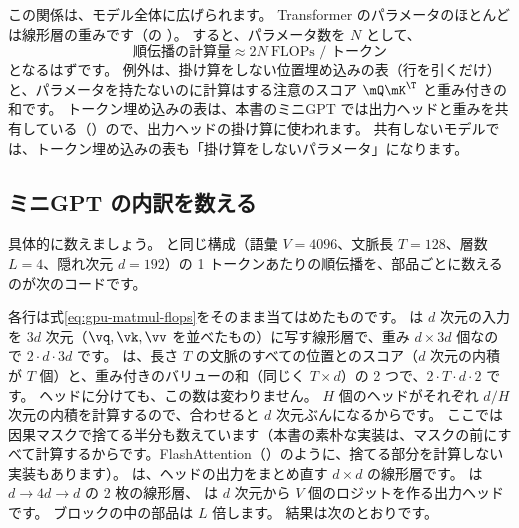 この関係は、モデル全体に広げられます。
Transformer のパラメータのほとんどは線形層の重みです（の ）。
すると、パラメータ数を $N$ として、
\begin{equation}
  \text{順伝播の計算量} \approx 2N \ \text{FLOPs / トークン}
  \label{eq:gpu-forward-2n}
\end{equation}
となるはずです。
例外は、掛け算をしない位置埋め込みの表（行を引くだけ）と、パラメータを持たないのに計算はする注意のスコア $\mQ\mK^\T$ と重み付きの和です。
トークン埋め込みの表は、本書のミニGPT では出力ヘッドと重みを共有している（）ので、出力ヘッドの掛け算に使われます。
共有しないモデルでは、トークン埋め込みの表も「掛け算をしないパラメータ」になります。

\subsection*{ミニGPT の内訳を数える}

具体的に数えましょう。
 と同じ構成（語彙 $V=4096$、文脈長 $T=128$、層数 $L=4$、隠れ次元 $d=192$）の 1 トークンあたりの順伝播を、部品ごとに数えるのが次のコードです。


各行は式\eqref{eq:gpu-matmul-flops}をそのまま当てはめたものです。
 は $d$ 次元の入力を $3d$ 次元（$\vq,\vk,\vv$ を並べたもの）に写す線形層で、重み $d\times3d$ 個なので $2\cdot d\cdot3d$ です。
 は、長さ $T$ の文脈のすべての位置とのスコア（$d$ 次元の内積が $T$ 個）と、重み付きのバリューの和（同じく $T\times d$）の 2 つで、$2\cdot T\cdot d\cdot 2$ です。
ヘッドに分けても、この数は変わりません。
$H$ 個のヘッドがそれぞれ $d/H$ 次元の内積を計算するので、合わせると $d$ 次元ぶんになるからです。
ここでは因果マスクで捨てる半分も数えています（本書の素朴な実装は、マスクの前にすべて計算するからです。FlashAttention（）のように、捨てる部分を計算しない実装もあります）。
 は、ヘッドの出力をまとめ直す $d\times d$ の線形層です。
 は $d\to4d\to d$ の 2 枚の線形層、 は $d$ 次元から $V$ 個のロジットを作る出力ヘッドです。
ブロックの中の部品は $L$ 倍します。
結果は次のとおりです。


